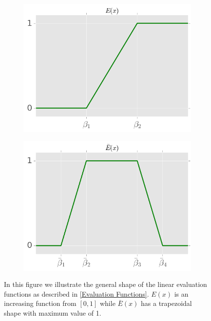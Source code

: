 \documentclass[paper=a4, fontsize=11pt]{scrartcl}
\numberwithin{equation}{section}		%
\numberwithin{figure}{section}			%
\numberwithin{table}{section}				%
\begin{document}
\begin{figure}[h]
\begin{subfigure}{.5\textwidth}
\includegraphics[scale=0.5]{E.png}
\end{subfigure}
\begin{subfigure}{.5\textwidth}
\includegraphics[scale=0.5]{E_.png}
\end{subfigure}
\caption{In this figure we illustrate the general shape of the linear evaluation functions as described in \ref{Evaluation Functions}. $E(x)$ is an increasing function from $[0,1]$ while $\bar{E}(x)$ has a trapezoidal shape with maximum value of 1.} 
\label{evaluation function graphs}
\end{figure}
\end{document}
